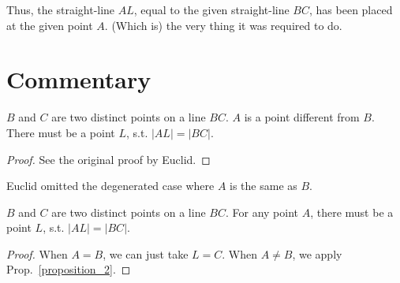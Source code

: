 Thus, the straight-line $AL$, equal to the given straight-line $BC$,
has been placed at the given point $A$. (Which is) the very thing it was required to do.

\section*{Commentary}

\begin{proposition}\label{proposition_2}\leanok
    $B$ and $C$ are two distinct points on a line $BC$. $A$ is a point different from $B$. There must be a point $L$, s.t. $|AL| = |BC|$.
\end{proposition}
\begin{proof}
    \leanok
    See the original proof by Euclid.
\end{proof}

Euclid omitted the degenerated case where $A$ is the same as $B$.

\begin{proposition}\label{proposition_2'}\leanok
    $B$ and $C$ are two distinct points on a line $BC$. For any point $A$, there must be a point $L$, s.t. $|AL| = |BC|$.
\end{proposition}
\begin{proof}
    \leanok
    When $A = B$, we can just take $L = C$.
    When $A \neq B$, we apply Prop.~\ref{proposition_2}.
\end{proof}